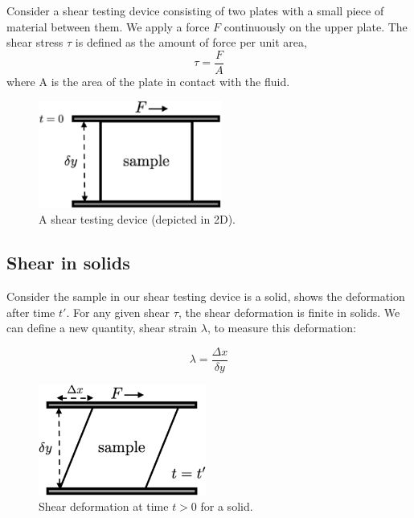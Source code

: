 Consider a shear testing device consisting of two plates with a small piece of material between them. We apply a force $F$ continuously on the upper plate. The shear stress $\tau$ is defined as the amount of force per unit area,
\begin{equation}
  \tau = \frac{F}{A}
\end{equation}
where A is the area of the plate in contact with the fluid.

\begin{figure}[h] \label{fig:shear-testing}
  \centering
  \includegraphics[width=6cm]{fig/shear-testing.png}
  \caption{A shear testing device (depicted in 2D).}
\end{figure}


\subsection{Shear in solids}

Consider the sample in our shear testing device is a solid,  shows the deformation after time $t'$. For any given shear $\tau$, the shear deformation is finite in solids. We can define a new quantity, shear strain $\lambda$, to measure this deformation:

\begin{equation}
  \lambda = \frac{ \Delta x }{ \delta y }
\end{equation}

\begin{figure} \label{fig:shear-solids}
  \centering
  \includegraphics[width=5.5cm]{fig/shear-solid.png}
  \caption{Shear deformation at time $t>0$ for a solid.}
\end{figure}

